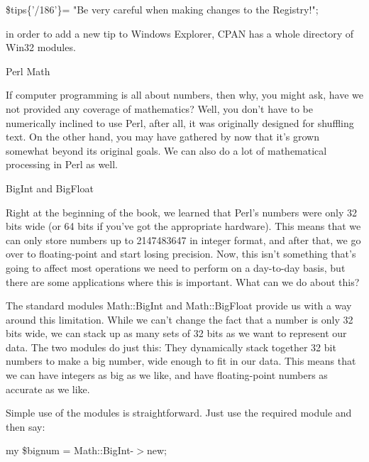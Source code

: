 \documentclass[a4paper,11pt]{book}
\begin{document}
\noindent 

\noindent \$tips\{'/186'\}= "Be very careful when making changes to the Registry!";

\noindent 

\noindent in order to add a new tip to Windows Explorer, CPAN has a whole directory of Win32 modules.

\noindent 

\noindent 

\noindent Perl Math

\noindent If computer programming is all about numbers, then why, you might ask, have we not provided any coverage of mathematics? Well, you don't have to be numerically inclined to use Perl, after all, it was originally designed for shuffling text. On the other hand, you may have gathered by now that it's grown somewhat beyond its original goals. We can also do a lot of mathematical processing in Perl as well.

\noindent 

\noindent BigInt and BigFloat

\noindent Right at the beginning of the book, we learned that Perl's numbers were only 32 bits wide (or 64 bits if you've got the appropriate hardware). This means that we can only store numbers up to 2147483647 in integer format, and after that, we go over to floating-point and start losing precision. Now, this isn't something that's going to affect most operations we need to perform on a day-to-day basis, but there are some applications where this is important. What can we do about this?

\noindent 

\noindent The standard modules Math::BigInt and Math::BigFloat provide us with a way around this limitation. While we can't change the fact that a number is only 32 bits wide, we can stack up as many sets of 32 bits as we want to represent our data. The two modules do just this: They dynamically stack together 32 bit numbers to make a big number, wide enough to fit in our data. This means that we can have integers as big as we like, and have floating-point numbers as accurate as we like.

\noindent 

\noindent Simple use of the modules is straightforward. Just use the required module and then say:

\noindent 

\noindent my \$bignum = Math::BigInt-$>$new;

\noindent 
\end{document}
